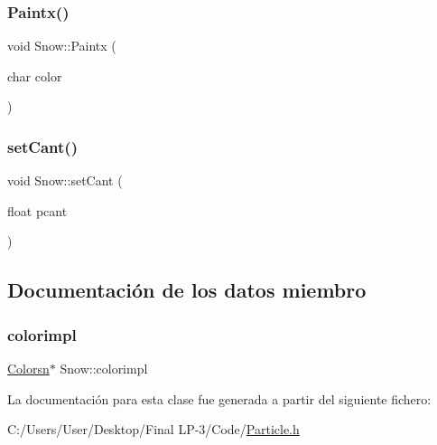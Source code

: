 \subsubsection{\texorpdfstring{Paintx()}{Paintx()}}
{\footnotesize\ttfamily void Snow\+::\+Paintx (\begin{DoxyParamCaption}\item[{char}]{color }\end{DoxyParamCaption})\hspace{0.3cm}{\ttfamily [inline]}}

\mbox{\label{class_snow_a6f548af958d4f69411ec04fa16b2dc70}} 
\subsubsection{\texorpdfstring{setCant()}{setCant()}}
{\footnotesize\ttfamily void Snow\+::set\+Cant (\begin{DoxyParamCaption}\item[{float}]{pcant }\end{DoxyParamCaption})\hspace{0.3cm}{\ttfamily [inline]}}



\subsection{Documentación de los datos miembro}
\mbox{\label{class_snow_a9d3814c830ebd32de04f5b03c8a978ae}} 
\subsubsection{\texorpdfstring{colorimpl}{colorimpl}}
{\footnotesize\ttfamily \mbox{\hyperlink{class_colorsn}{Colorsn}}$\ast$ Snow\+::colorimpl\hspace{0.3cm}{\ttfamily [protected]}}



La documentación para esta clase fue generada a partir del siguiente fichero\+:\begin{DoxyCompactItemize}
\item 
C\+:/\+Users/\+User/\+Desktop/\+Final L\+P-\/3/\+Code/\mbox{\hyperlink{_particle_8h}{Particle.\+h}}\end{DoxyCompactItemize}
